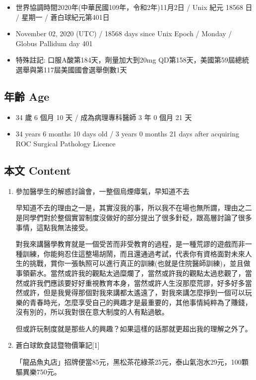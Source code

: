 \documentclass[a5paper, 11pt
]{book}
\providecommand{\tightlist}{%
  \setlength{\itemsep}{0pt}\setlength{\parskip}{0pt}}
\begin{document}
\begin{itemize}
\tightlist
\item
  世界協調時間2020年(中華民國109年，令和2年)11月2日 / Unix 紀元 18568 日
  / 星期一 / 蒼白球紀元第401日
\item
  November 02, 2020 (UTC) / 18568 days since Unix Epoch / Monday /
  Globus Pallidum day 401
\item
  特殊註記: 口服A酸第184天，劑量加大到20mg
  QD第158天，美國第59屆總統選舉與第117屆美國國會選舉倒數1天
\end{itemize}

\hypertarget{ux5e74ux9f61-age-59}{%
\subsection{年齡 Age}\label{ux5e74ux9f61-age-59}}

\begin{itemize}
\tightlist
\item
  34 歲 6 個月 10 天 / 成為病理專科醫師 3 年 0 個月 21 天
\item
  34 years 6 months 10 days old / 3 years 0 months 21 days after
  acquiring ROC Surgical Pathology Licence
\end{itemize}

\hypertarget{ux672cux6587-content-59}{%
\subsection{本文 Content}\label{ux672cux6587-content-59}}

\begin{enumerate}
\def\labelenumi{\arabic{enumi}.}
\item
  參加醫學生的解惑討論會，一整個烏煙瘴氣，早知道不去

  早知道不去的理由之一是，其實沒我的事，所以我不在場也無所謂，理由之二是同學們對於整個實習制度沒做好的部分提出了很多針砭，跟高層討論了很多事情，這點我無法接受。

  對我來講醫學教育就是一個受苦而非受教育的過程，是一種荒謬的遊戲而非一種訓練，你能夠忍住這整場胡鬧，而且還通過考試，代表你有資格面對未來人生的挑戰，賞你一張執照可以進行真正的訓練(也就是住院醫師訓練)，並且做事領薪水。當然或許我的觀點太過糜爛了，當然或許我的觀點太過悲觀了，當然或許我們應該要好好重視教育本身，當然或許人生沒那麼荒謬，好多好多當然或許，但是我覺得那個對我來講都太遙遠了，對我來講怎麼掙到一個可以玩樂的青春時光，怎麼享受自己的興趣才是最重要的，其他事情純粹為了賺錢，沒有別的，所以我對很在意大制度的人有點過敏。

  但或許玩制度就是那些人的興趣？如果這樣的話那就更超出我的理解之外了。
\item
  蒼白球飲食誌暨物價筆記{[}1{]}

  「龍品魚丸店」招牌便當85元，黑松茶花綠茶25元，泰山氣泡水29元，100顆驅異樂750元。
\end{enumerate}
\end{document}

